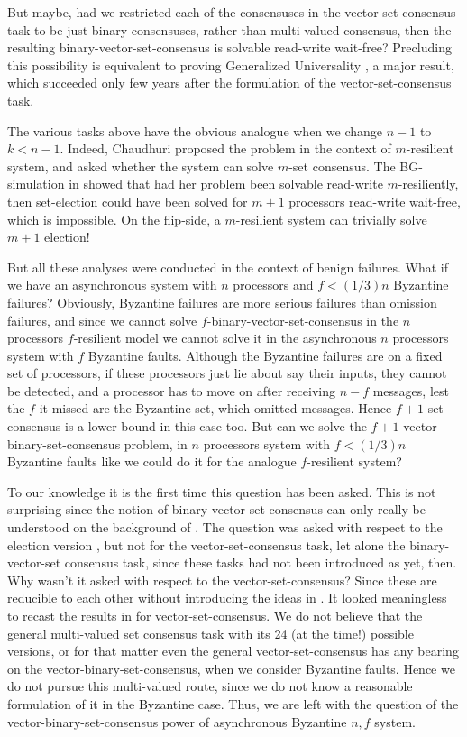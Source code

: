 \documentclass[11pt]{article}
\begin{document}
But maybe, had we restricted each of the consensuses in the vector-set-consensus task to be just binary-consensuses,
rather than multi-valued consensus, then the resulting binary-vector-set-consensus is solvable
read-write wait-free? 
Precluding this possibility is equivalent to proving Generalized Universality \cite{Rachid},
a major result, which succeeded only few years after the formulation of the vector-set-consensus task.  

The various tasks above have the obvious analogue when we change $n-1$ to $k < n-1$.
Indeed, Chaudhuri \cite{SC} proposed the problem in the context of $m$-resilient system, and asked
whether the system can solve $m$-set consensus. The BG-simulation in \cite{BG,BGLR} showed that had her problem
been solvable read-write $m$-resiliently, then set-election could have been solved for $m+1$ processors read-write
wait-free, which is impossible. On the flip-side, a $m$-resilient system can trivially solve $m+1$ election! 

But all these analyses were conducted in the context of benign failures. What if we have an asynchronous
system with $n$ processors and $f<(1/3)n$ Byzantine failures? Obviously, Byzantine failures are more serious failures than
omission failures, and since we cannot solve $f$-binary-vector-set-consensus in the $n$ processors $f$-resilient
model we cannot solve it in the asynchronous $n$ processors system with $f$ Byzantine faults.
Although the Byzantine failures are on a fixed set of processors, if these processors just lie about say 
their inputs, they cannot be detected, and a processor has to move on after receiving $n-f$ messages,
lest the $f$ it missed are the Byzantine set, which omitted messages. 
Hence $f+1$-set consensus is a lower bound in this case too. But can we solve
the $f+1$-vector-binary-set-consensus problem, in $n$ processors system with $f<(1/3)n$ Byzantine faults like we could do
it for the analogue $f$-resilient system? 

To our knowledge it is the first time this question has been asked.
This is not surprising since the notion of binary-vector-set-consensus can only really be understood on the background of \cite{Rachid}.
The question was asked with respect to the election version \cite{Dalia}, but not for the vector-set-consensus task, let alone the binary-vector-set consensus task, since these tasks
had not been introduced as yet, then.
Why wasn't it asked with respect to the vector-set-consensus? Since these are reducible to each other without
introducing the ideas in \cite{Rachid}. It looked meaningless to recast the results in \cite{Dalia} for vector-set-consensus. We do not believe that the general multi-valued set consensus task with 
its 24 (at the time!)  possible versions, or for that matter even the general vector-set-consensus has any bearing on the vector-binary-set-consensus,
when we consider Byzantine faults. Hence we do not pursue this multi-valued route, since we do not know a reasonable formulation of it in the Byzantine case.
Thus, we are left with the question of the vector-binary-set-consensus power of
asynchronous Byzantine $n,f$ system.
\end{document}
